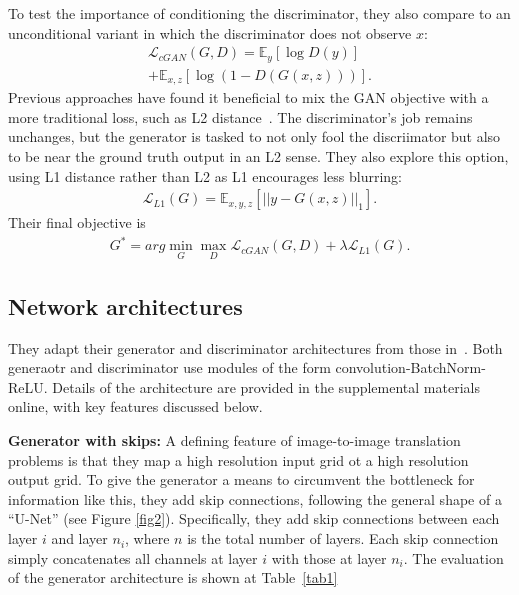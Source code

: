 \documentclass[10pt,twocolumn,letterpaper]{article}
\begin{document}
To test the importance of conditioning the discriminator, they also compare to an unconditional variant in which the discriminator does not observe $x$:\\
\begin{multline}
\mathcal{L}_{cGAN}(G, D) = \mathbb{E}_y[\log D(y)] \\
+ \mathbb{E}_{x, z}[\log(1 - D(G(x, z)))].
\end{multline}
Previous approaches have found it beneficial to mix the GAN objective with a more traditional loss, such as L2 distance~\cite{Context}. The discriminator's job remains unchanges, but the generator is tasked to not only fool the discriimator but also to be near the ground truth output in an L2 sense. They also explore this option, using L1 distance rather than L2 as L1 encourages less blurring:\\
\begin{gather}
\mathcal{L}_{L1}(G) = \mathbb{E}_{x, y, z}[||y - G(x, z)||_1].
\end{gather}
Their final objective is \\
\begin{gather}
G^{\ast} = arg\mathop{\min}\limits_G \mathop{\max}\limits_D\mathcal{L}_{cGAN}(G, D) + \lambda\mathcal{L}_{L1}(G).
\end{gather}

\subsection{Network architectures}

They adapt their generator and discriminator architectures from those in~\cite{Unsupervised}. Both generaotr and discriminator use modules of the form convolution-BatchNorm-ReLU. Details of the architecture are provided in the supplemental materials online, with key features discussed below. 

{\bf Generator with skips:} A defining feature of image-to-image translation problems is that they map a high resolution input grid ot a high resolution output grid. To give the generator a means to circumvent the bottleneck for information like this, they add skip connections, following the general shape of a ``U-Net'' (see Figure \ref{fig2}). Specifically, they add skip connections between each layer $i$ and layer $n_i$, where $n$ is the total number of layers. Each skip connection simply concatenates all channels at layer $i$ with those at layer $n_i$. The evaluation of the generator architecture is shown at Table~\ref{tab1}
\end{document}
